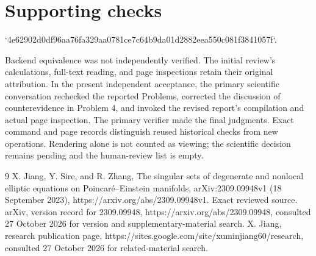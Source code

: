 \documentclass[10pt]{article}
\begin{document}
\section*{Supporting checks}
`4e62902d0df96aa76fa329aa0781ce7c64b9da01d2882eea550c081f3841057f`.\par
Backend equivalence was not independently verified. The initial review’s calculations, full-text reading, and page inspections retain their original attribution. In the present independent acceptance, the primary scientific conversation rechecked the reported Problems, corrected the discussion of counterevidence in Problem 4, and invoked the revised report’s compilation and actual page inspection. The primary verifier made the final judgments. Exact command and page records distinguish reused historical checks from new operations. Rendering alone is not counted as viewing; the scientific decision remains pending and the human-review list is empty.\par
9 X. Jiang, Y. Sire, and R. Zhang, The singular sets of degenerate and nonlocal elliptic equations on Poincaré–Einstein manifolds, arXiv:2309.09948v1 (18 September 2023), https://arxiv.org/abs/2309.09948v1. Exact reviewed source. arXiv, version record for 2309.09948, https://arxiv.org/abs/2309.09948, consulted 27 October 2026 for version and supplementary-material search. X. Jiang, research publication page, https://sites.google.com/site/xuminjiang60/research, consulted 27 October 2026 for related-material search.\par
\end{document}

